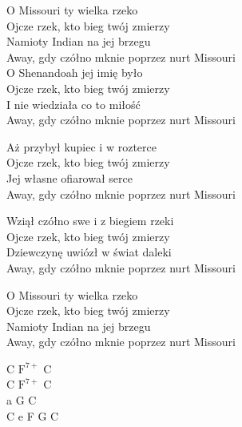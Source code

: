 \begin{text}
    O Missouri ty wielka rzeko\\
    Ojcze rzek, kto bieg twój zmierzy\\
    Namioty Indian na jej brzegu\\
    Away, gdy czółno mknie poprzez nurt Missouri\\

    O Shenandoah jej imię było\\
    Ojcze rzek, kto bieg twój zmierzy\\
    I nie wiedziała co to miłość\\
    Away, gdy czółno mknie poprzez nurt Missouri

    Aż przybył kupiec i w rozterce\\
    Ojcze rzek, kto bieg twój zmierzy\\
    Jej własne ofiarował serce\\
    Away, gdy czółno mknie poprzez nurt Missouri

    Wziął czółno swe i z biegiem rzeki\\
    Ojcze rzek, kto bieg twój zmierzy\\
    Dziewczynę uwiózł w świat daleki\\
    Away, gdy czółno mknie poprzez nurt Missouri

    O Missouri ty wielka rzeko\\
    Ojcze rzek, kto bieg twój zmierzy\\
    Namioty Indian na jej brzegu\\
    Away, gdy czółno mknie poprzez nurt Missouri
\end{text}
\begin{chord}
    C $\mathrm{F^{7+}}$ C\\
    C $\mathrm{F^{7+}}$ C\\
    a G C\\
    C e F G C
\end{chord}
